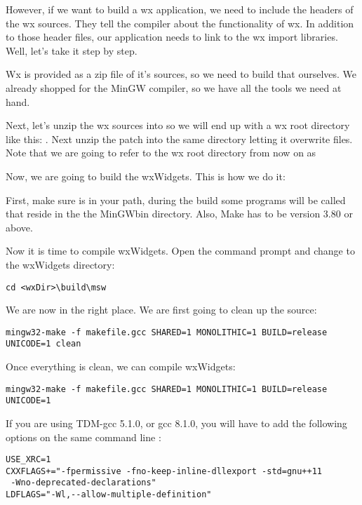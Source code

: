 However, if we want to build a wx application, we need to include the headers of the wx sources. They tell the compiler about the functionality of wx. In addition to those header files, our application needs to link to the wx import libraries. Well, let's take it step by step.

Wx is provided as a zip file of it's sources, so we need to build that ourselves. We already shopped for the MinGW compiler, so we have all the tools we need at hand.

Next, let's unzip the wx sources into  so we will end up with a wx root directory like this: . Next unzip the patch into the same directory letting it overwrite files. Note that we are going to refer to the wx root directory from now on as 

Now, we are going to build the wxWidgets. This is how we do it:

First, make sure  is in your path, during the build some programs will be called that reside in the the MinGW\osp bin directory. Also, Make has to be version 3.80 or above.

Now it is time to compile wxWidgets. Open the command prompt and change to the wxWidgets directory:

\begin{verbatim}
cd <wxDir>\build\msw
\end{verbatim}

We are now in the right place. We are first going to clean up the source:

\begin{verbatim}
mingw32-make -f makefile.gcc SHARED=1 MONOLITHIC=1 BUILD=release UNICODE=1 clean
\end{verbatim}

Once everything is clean, we can compile wxWidgets:

\begin{verbatim}
mingw32-make -f makefile.gcc SHARED=1 MONOLITHIC=1 BUILD=release UNICODE=1
\end{verbatim}

If you are using TDM-gcc 5.1.0, or gcc 8.1.0, you will have to add the following options on the same command line : 
\begin{verbatim}
USE_XRC=1
CXXFLAGS+="-fpermissive	-fno-keep-inline-dllexport -std=gnu++11
 -Wno-deprecated-declarations"
LDFLAGS="-Wl,--allow-multiple-definition"
\end{verbatim}  

